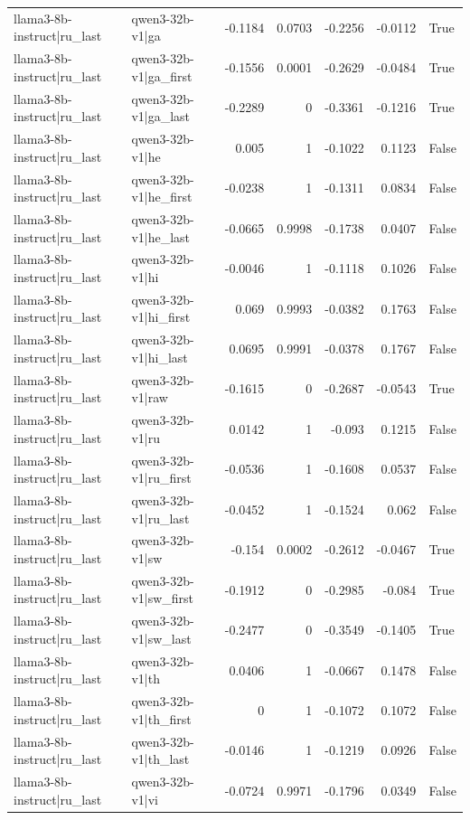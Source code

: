 \begin{table}
\begin{tabular}{l l r r r r l}
llama3-8b-instruct|ru_last & qwen3-32b-v1|ga & -0.1184 & 0.0703 & -0.2256 & -0.0112 & True \\
llama3-8b-instruct|ru_last & qwen3-32b-v1|ga_first & -0.1556 & 0.0001 & -0.2629 & -0.0484 & True \\
llama3-8b-instruct|ru_last & qwen3-32b-v1|ga_last & -0.2289 & 0 & -0.3361 & -0.1216 & True \\
llama3-8b-instruct|ru_last & qwen3-32b-v1|he & 0.005 & 1 & -0.1022 & 0.1123 & False \\
llama3-8b-instruct|ru_last & qwen3-32b-v1|he_first & -0.0238 & 1 & -0.1311 & 0.0834 & False \\
llama3-8b-instruct|ru_last & qwen3-32b-v1|he_last & -0.0665 & 0.9998 & -0.1738 & 0.0407 & False \\
llama3-8b-instruct|ru_last & qwen3-32b-v1|hi & -0.0046 & 1 & -0.1118 & 0.1026 & False \\
llama3-8b-instruct|ru_last & qwen3-32b-v1|hi_first & 0.069 & 0.9993 & -0.0382 & 0.1763 & False \\
llama3-8b-instruct|ru_last & qwen3-32b-v1|hi_last & 0.0695 & 0.9991 & -0.0378 & 0.1767 & False \\
llama3-8b-instruct|ru_last & qwen3-32b-v1|raw & -0.1615 & 0 & -0.2687 & -0.0543 & True \\
llama3-8b-instruct|ru_last & qwen3-32b-v1|ru & 0.0142 & 1 & -0.093 & 0.1215 & False \\
llama3-8b-instruct|ru_last & qwen3-32b-v1|ru_first & -0.0536 & 1 & -0.1608 & 0.0537 & False \\
llama3-8b-instruct|ru_last & qwen3-32b-v1|ru_last & -0.0452 & 1 & -0.1524 & 0.062 & False \\
llama3-8b-instruct|ru_last & qwen3-32b-v1|sw & -0.154 & 0.0002 & -0.2612 & -0.0467 & True \\
llama3-8b-instruct|ru_last & qwen3-32b-v1|sw_first & -0.1912 & 0 & -0.2985 & -0.084 & True \\
llama3-8b-instruct|ru_last & qwen3-32b-v1|sw_last & -0.2477 & 0 & -0.3549 & -0.1405 & True \\
llama3-8b-instruct|ru_last & qwen3-32b-v1|th & 0.0406 & 1 & -0.0667 & 0.1478 & False \\
llama3-8b-instruct|ru_last & qwen3-32b-v1|th_first & 0 & 1 & -0.1072 & 0.1072 & False \\
llama3-8b-instruct|ru_last & qwen3-32b-v1|th_last & -0.0146 & 1 & -0.1219 & 0.0926 & False \\
llama3-8b-instruct|ru_last & qwen3-32b-v1|vi & -0.0724 & 0.9971 & -0.1796 & 0.0349 & False \\

\end{tabular}
\end{table}
